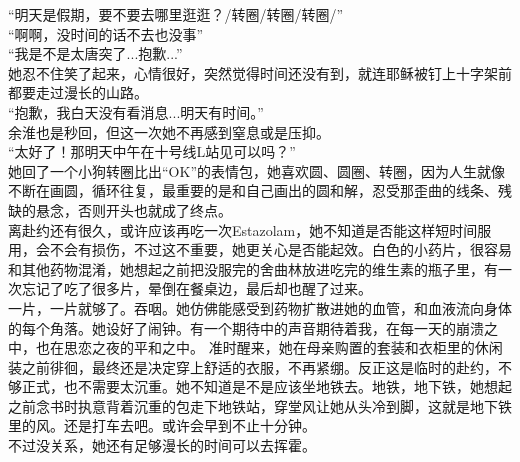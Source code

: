 \documentclass[letterpaper, 12pt]{article}
\begin{document}
\begin{multicols}{2}
“明天是假期，要不要去哪里逛逛？/转圈/转圈/转圈/”\\

“啊啊，没时间的话不去也没事”\\

“我是不是太唐突了...抱歉...”\\

她忍不住笑了起来，心情很好，突然觉得时间还没有到，就连耶稣被钉上十字架前都要走过漫长的山路。\\

“抱歉，我白天没有看消息...明天有时间。”\\

 余淮也是秒回，但这一次她不再感到窒息或是压抑。\\
 
“太好了！那明天中午在十号线L站见可以吗？”\\

  她回了一个小狗转圈比出“OK”的表情包，她喜欢圆、圆圈、转圈，因为人生就像不断在画圆，循环往复，最重要的是和自己画出的圆和解，忍受那歪曲的线条、残缺的悬念，否则开头也就成了终点。\\
  
  离赴约还有很久，或许应该再吃一次Estazolam，她不知道是否能这样短时间服用，会不会有损伤，不过这不重要，她更关心是否能起效。白色的小药片，很容易和其他药物混淆，她想起之前把没服完的舍曲林放进吃完的维生素的瓶子里，有一次忘记了吃了很多片，晕倒在餐桌边，最后却也醒了过来。\\
  
  一片，一片就够了。吞咽。她仿佛能感受到药物扩散进她的血管，和血液流向身体的每个角落。她设好了闹钟。有一个期待中的声音期待着我，在每一天的崩溃之中，也在思恋之夜的平和之中。
  准时醒来，她在母亲购置的套装和衣柜里的休闲装之前徘徊，最终还是决定穿上舒适的衣服，不再紧绷。反正这是临时的赴约，不够正式，也不需要太沉重。她不知道是不是应该坐地铁去。地铁，地下铁，她想起之前念书时执意背着沉重的包走下地铁站，穿堂风让她从头冷到脚，这就是地下铁里的风。还是打车去吧。或许会早到不止十分钟。\\
  
不过没关系，她还有足够漫长的时间可以去挥霍。

\end{multicols} 
\end{document}
